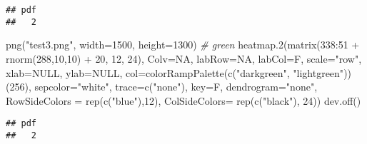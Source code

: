 \documentclass[
]{article}
\newenvironment{Shaded}{\begin{snugshade}}{\end{snugshade}}
\newcommand{\AttributeTok}[1]{\textcolor[rgb]{0.77,0.63,0.00}{#1}}
\newcommand{\CommentTok}[1]{\textcolor[rgb]{0.56,0.35,0.01}{\textit{#1}}}
\newcommand{\ConstantTok}[1]{\textcolor[rgb]{0.00,0.00,0.00}{#1}}
\newcommand{\DecValTok}[1]{\textcolor[rgb]{0.00,0.00,0.81}{#1}}
\newcommand{\FunctionTok}[1]{\textcolor[rgb]{0.00,0.00,0.00}{#1}}
\newcommand{\NormalTok}[1]{#1}
\newcommand{\SpecialCharTok}[1]{\textcolor[rgb]{0.00,0.00,0.00}{#1}}
\newcommand{\StringTok}[1]{\textcolor[rgb]{0.31,0.60,0.02}{#1}}
\begin{document}
\begin{verbatim}
## pdf 
##   2
\end{verbatim}

\begin{Shaded}
\begin{Highlighting}[]
\FunctionTok{png}\NormalTok{(}\StringTok{"test3.png"}\NormalTok{, }\AttributeTok{width=}\DecValTok{1500}\NormalTok{, }\AttributeTok{height=}\DecValTok{1300}\NormalTok{)  }\CommentTok{\# green}
\FunctionTok{heatmap.2}\NormalTok{(}\FunctionTok{matrix}\NormalTok{(}\DecValTok{338}\SpecialCharTok{:}\DecValTok{51} \SpecialCharTok{+} \FunctionTok{rnorm}\NormalTok{(}\DecValTok{288}\NormalTok{,}\DecValTok{10}\NormalTok{,}\DecValTok{10}\NormalTok{) }\SpecialCharTok{+} \DecValTok{20}\NormalTok{, }\DecValTok{12}\NormalTok{, }\DecValTok{24}\NormalTok{), }\AttributeTok{Colv=}\ConstantTok{NA}\NormalTok{, }\AttributeTok{labRow=}\ConstantTok{NA}\NormalTok{,}
          \AttributeTok{labCol=}\NormalTok{F, }\AttributeTok{scale=}\StringTok{"row"}\NormalTok{, }\AttributeTok{xlab=}\ConstantTok{NULL}\NormalTok{, }\AttributeTok{ylab=}\ConstantTok{NULL}\NormalTok{,}
          \AttributeTok{col=}\FunctionTok{colorRampPalette}\NormalTok{(}\FunctionTok{c}\NormalTok{(}\StringTok{"darkgreen"}\NormalTok{, }\StringTok{"lightgreen"}\NormalTok{))(}\DecValTok{256}\NormalTok{), }
        \AttributeTok{sepcolor=}\StringTok{"white"}\NormalTok{, }\AttributeTok{trace=}\FunctionTok{c}\NormalTok{(}\StringTok{"none"}\NormalTok{), }\AttributeTok{key=}\NormalTok{F, }\AttributeTok{dendrogram=}\StringTok{"none"}\NormalTok{,}
        \AttributeTok{RowSideColors =} \FunctionTok{rep}\NormalTok{(}\FunctionTok{c}\NormalTok{(}\StringTok{"blue"}\NormalTok{),}\DecValTok{12}\NormalTok{), }\AttributeTok{ColSideColors=}  \FunctionTok{rep}\NormalTok{(}\FunctionTok{c}\NormalTok{(}\StringTok{"black"}\NormalTok{), }\DecValTok{24}\NormalTok{))}
\FunctionTok{dev.off}\NormalTok{()}
\end{Highlighting}
\end{Shaded}

\begin{verbatim}
## pdf 
##   2
\end{verbatim}
\end{document}
